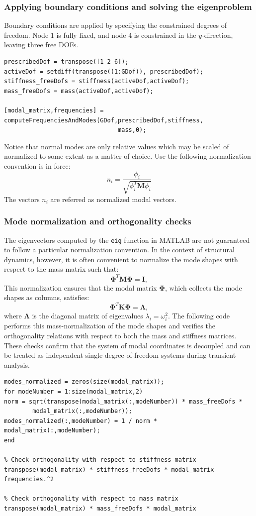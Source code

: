 \documentclass[12pt]{article}
\begin{document}
\subsubsection*{Applying boundary conditions and solving the eigenproblem}
Boundary conditions are applied by specifying the constrained degrees of freedom. Node 1 is fully fixed, and node 4 is constrained in the $y$-direction, leaving three free DOFs.

\begin{verbatim}
prescribedDof = transpose([1 2 6]);
activeDof = setdiff(transpose((1:GDof)), prescribedDof);
stiffness_freeDofs = stiffness(activeDof,activeDof);
mass_freeDofs = mass(activeDof,activeDof);

[modal_matrix,frequencies] = computeFrequenciesAndModes(GDof,prescribedDof,stiffness,
                                mass,0);
\end{verbatim}
Notice that normal modes are only relative values which may be scaled of normalized to some extent as a matter of choice. Use the following normalization convention is in force:
$$n_i=\frac{\phi_i}{\sqrt{\phi_i^T\mathbf M \phi_i}}$$
The vectors $n_i$ are referred as normalized modal vectors.

\subsubsection*{Mode normalization and orthogonality checks}
The eigenvectors computed by the \texttt{eig} function in MATLAB are not guaranteed to follow a particular normalization convention. In the context of structural dynamics, however, it is often convenient to normalize the mode shapes with respect to the mass matrix such that:
$$\boldsymbol{\Phi}^T \mathbf{M} \boldsymbol{\Phi} = \mathbf I,$$
This normalization ensures that the modal matrix $\boldsymbol\Phi$, which collects the mode shapes as columns, satisfies:
$$\boldsymbol{\Phi}^T \mathbf{K} \boldsymbol{\Phi} = \mathbf {\Lambda},$$
where $\mathbf {\Lambda}$ is the diagonal matrix of eigenvalues $\lambda_i=\omega_i^2$. The following code performs this mass-normalization of the mode shapes and verifies the orthogonality relations with respect to both the mass and stiffness matrices. These checks confirm that the system of modal coordinates is decoupled and can be treated as independent single-degree-of-freedom systems during transient analysis.

\begin{verbatim}
modes_normalized = zeros(size(modal_matrix));
for modeNumber = 1:size(modal_matrix,2)
norm = sqrt(transpose(modal_matrix(:,modeNumber)) * mass_freeDofs * 
        modal_matrix(:,modeNumber));
modes_normalized(:,modeNumber) = 1 / norm * modal_matrix(:,modeNumber);
end

% Check orthogonality with respect to stiffness matrix
transpose(modal_matrix) * stiffness_freeDofs * modal_matrix
frequencies.^2

% Check orthogonality with respect to mass matrix
transpose(modal_matrix) * mass_freeDofs * modal_matrix
\end{verbatim}
\end{document}
